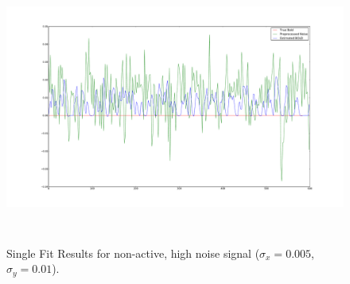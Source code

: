 \begin{figure}[H]
\centering
\includegraphics[clip=true,trim=6cm 3cm 6cm 3cm,height=9cm]{images/justbignoise_fit_0}
\caption{Single Fit Results for non-active, high noise signal
 ($\sigma_x = 0.005$, $\sigma_y = 0.01$).}
\label{fig:justbignoise_fit_0}
\end{figure} %


